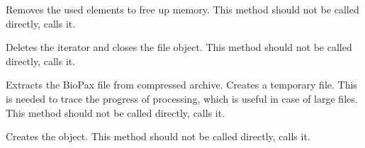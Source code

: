 \documentclass[letterpaper,10pt,english]{sphinxmanual}
\begin{document}
\begin{fulllineitems}
\begin{fulllineitems}
\end{fulllineitems}


\begin{fulllineitems}
\label{\detokenize{reference:pypath.pyreact.BioPaxReader.cleanup_hook}}
Removes the used elements to free up memory.
This method should not be called directly,
 calls it.

\end{fulllineitems}


\begin{fulllineitems}
\label{\detokenize{reference:pypath.pyreact.BioPaxReader.close_biopax}}
Deletes the iterator and closes the file object.
This method should not be called directly,
 calls it.

\end{fulllineitems}


\begin{fulllineitems}
\label{\detokenize{reference:pypath.pyreact.BioPaxReader.extract}}
Extracts the BioPax file from compressed archive. Creates a
temporary file. This is needed to trace the progress of
processing, which is useful in case of large files.
This method should not be called directly,
 calls it.

\end{fulllineitems}


\begin{fulllineitems}
\label{\detokenize{reference:pypath.pyreact.BioPaxReader.init_etree}}
Creates the  object.
This method should not be called directly,
 calls it.


\end{fulllineitems}
\end{fulllineitems}
\end{document}

